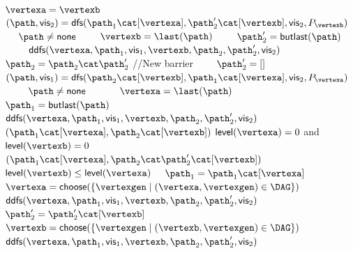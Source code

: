 \begin{algorithm}\DontPrintSemicolon
   $\vertexa = \vertexb$\;
  \ \ $(\path,\visb) = \dfs(\patha\cat[\vertexa], \pathb'\cat[\vertexb], \visb, \Plevel{\vertexb})$\;
  \ \  $\path \neq \none$\;
  \ \ \ \ $\vertexb=\last(\path)$\;
  \ \ \ \ $\pathb'=\butlast(\path)$\;
  \ \ \ \  $\ddfs(\vertexa,\path_1,\visa,\vertexb,\path_2,\path_2',\visb)$\;
  \ \ \;
  \ \ \ \ $\pathb=\pathb\cat\pathb'$ //New barrier\;
  \ \ \ \ $\pathb'=[]$\;
  \ \ \ \ $(\path,\visa) = \dfs(\pathb\cat[\vertexb], \patha\cat[\vertexa],\visb, \Plevel{\vertexa})$\;
  \ \ \ \  $\path \neq \none$\;
  \ \ \ \ \ \ $\vertexa=\last(\path)$\;
  \ \ \ \ \ \ $\patha=\butlast(\path)$\;
  \ \ \ \ \ \  $\ddfs(\vertexa,\path_1,\visa,\vertexb,\path_2,\path_2',\visb)$\;
  \ \ \ \ \;
  \ \ \ \ \ \  $(\patha\cat[\vertexa], \pathb\cat[\vertexb])$\;
    $\level(\vertexa) = 0$ and $\level(\vertexb) = 0$\;
  \ \  $(\patha\cat[\vertexa], \pathb\cat\pathb'\cat[\vertexb])$\;
    $\level(\vertexb) \leq \level(\vertexa)$\;
  \ \ $\patha = \patha\cat[\vertexa]$\;
  \ \ $\vertexa = \choice(\{\vertexgen\mid (\vertexa,\vertexgen)\in \digraph\})$\;
  \ \  $\ddfs(\vertexa,\path_1,\visa,\vertexb,\path_2,\path_2',\visb)$\;
  \;
  \ \ $\pathb' = \pathb'\cat[\vertexb]$\;
  \ \ $\vertexb = \choice(\{\vertexgen\mid (\vertexb,\vertexgen)\in \digraph\})$\;
  \ \  $\ddfs(\vertexa,\path_1,\visa,\vertexb,\path_2,\path_2',\visb)$\;
  \caption{$\ddfs(\vertexa,\path_1,\visa,\vertexb,\path_2,\path_2',\visb)$}\label{alg:BlossomOrAug}
\end{algorithm}
